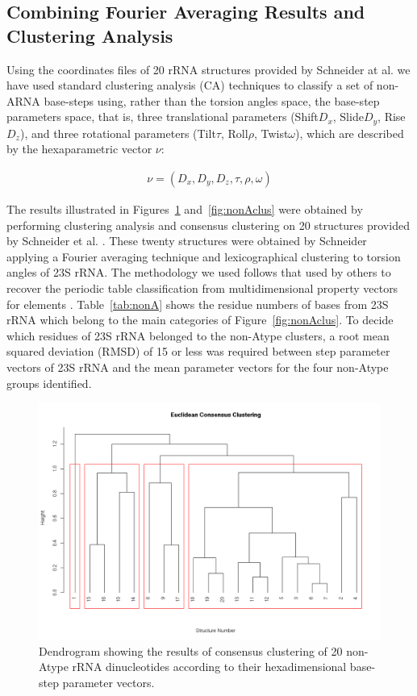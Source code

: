 \subsection{Combining Fourier Averaging Results and Clustering Analysis}
Using the coordinates files of 20 rRNA structures provided by 
Schneider at al.\cite{schneider2004}  we have
used standard clustering analysis (CA) techniques to classify a set of
non-ARNA base-steps  using, rather than the torsion  angles space, the
base-step  parameters space, that  is, three  translational parameters
(Shift$D_x$, Slide$D_y$,  Rise$D_z$), and three  rotational parameters
(Tilt$\tau$,  Roll$\rho$, Twist$\omega$), which  are described  by the
hexaparametric vector $\nu$:

\begin{gather}
 \nu = (D_x, D_y, D_z, \tau, \rho, \omega)
\end{gather}

The     results      illustrated     in     Figures~\ref{fig:eucl_cons}
and~\ref{fig:nonAclus} were  obtained   by   performing  clustering
analysis  and  consensus  clustering  on  20  structures  provided  by
Schneider et  al.  \cite{schneider2004}. These  twenty structures were
obtained  by  Schneider applying  a  Fourier  averaging technique  and
lexicographical  clustering  to  torsion  angles  of  23S  rRNA.   The
methodology  we  used follows  that  used  by  others to  recover  the
periodic table  classification from multidimensional  property vectors
for  elements \cite{restrepo2004,  restrepo2006}. Table~\ref{tab:nonA}
shows the residue  numbers of bases from 23S rRNA  which belong to the
main  categories   of  Figure~\ref{fig:nonAclus}.   To   decide  which
residues of  23S rRNA belonged to  the non-Atype clusters,  a root mean
squared  deviation (RMSD) of  15  or  less  was required  between  step
parameter vectors of  23S rRNA and the mean  parameter vectors for the 
four non-Atype groups identified.

\begin{figure}[htbp]
 \centering
\includegraphics[angle=90, scale=0.6]{Chapter2/eucli_cons_nonA-RNA.png}
\caption{Dendrogram showing the results  of consensus clustering of 20
non-Atype  rRNA  dinucleotides   according  to  their  hexadimensional
base-step parameter vectors.}
 \label{fig:eucl_cons}
\end{figure}


